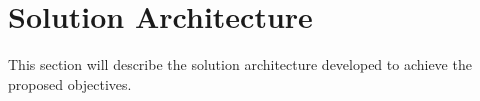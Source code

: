 \section{Solution Architecture}
\label{sec:Solution Architecture}
This section will describe the solution architecture developed to achieve the proposed objectives.
